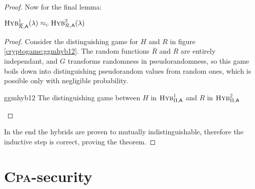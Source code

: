 \begin{proof}
    Now for the final lemma:

    \begin{lemma}
        $\hybridg{1}[\overline{\R}](\lambda) \compindist \hybridg{2}[\R](\lambda)$       
    \end{lemma}
    
    \begin{proof}
        Consider the distinguishing game for $H$ and $R$ in figure \ref{cryptogame:ggmhyb12}. The random functions $\overline{R}$ and $R$ are entirely independant, and $G$ transforms randomness in pseudorandomness, so this game boils down into distinguishing pseudorandom values from random ones, which is possible only with negligible probability.
        
        \begin{cryptogame}
            {ggmhyb12}
            {The distinguishing game between $H$ in $\hybridg{1}$ and $R$ in $\hybridg{2}$}
            {}


            \cseqdelay


            \cseqdelay


            \cseqdelay


        \end{cryptogame}
        
    \end{proof}

    In the end the hybrids are proven to mutually indistinguishable, therefore the inductive step is correct, proving the theorem.

\end{proof}

\section{\textsc{Cpa}-security}

